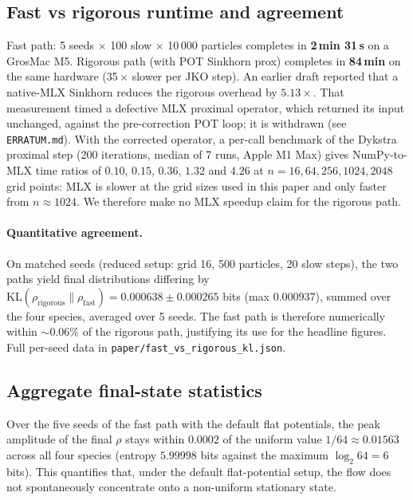 \documentclass[11pt]{article}
\begin{document}
\subsection{Fast vs rigorous runtime and agreement}
Fast path: 5 seeds $\times$ 100 slow $\times$ 10\,000 particles completes
in \textbf{2\,min 31\,s} on a GrosMac M5. Rigorous path (with POT Sinkhorn
prox) completes in \textbf{84\,min} on the same hardware
(35\,$\times$ slower per JKO step).
An earlier draft reported that a native-MLX Sinkhorn reduces the
rigorous overhead by $5.13\times$. That measurement timed a defective
MLX proximal operator, which returned its input unchanged, against the
pre-correction POT loop; it is withdrawn (see \texttt{ERRATUM.md}).
With the corrected operator, a per-call benchmark of the Dykstra
proximal step (200 iterations, median of 7 runs, Apple M1 Max) gives
NumPy-to-MLX time ratios of $0.10$, $0.15$, $0.36$, $1.32$ and $4.26$
at $n = 16, 64, 256, 1024, 2048$ grid points: MLX is slower at the
grid sizes used in this paper and only faster from $n \approx 1024$.
We therefore make no MLX speedup claim for the rigorous path.

\paragraph{Quantitative agreement.} On matched seeds
(reduced setup: grid 16, 500 particles, 20 slow steps), the two paths
yield final distributions differing by
$\mathrm{KL}(\rho_{\text{rigorous}} \| \rho_{\text{fast}}) =
0.000638 \pm 0.000265$ bits (max $0.000937$), summed over the four
species, averaged over 5 seeds. The fast path is therefore
numerically within $\sim\!0.06\%$ of the rigorous path, justifying
its use for the headline figures. Full per-seed data in
\texttt{paper/fast\_vs\_rigorous\_kl.json}.

\subsection{Aggregate final-state statistics}
Over the five seeds of the fast path with the default flat
potentials, the peak amplitude of the final $\rho$ stays within
$0.0002$ of the uniform value $1/64 \approx 0.01563$ across all four
species (entropy $5.99998$ bits against the maximum $\log_2 64 = 6$
bits). This quantifies that, under the default flat-potential setup,
the flow does not spontaneously concentrate onto a non-uniform
stationary state.
\end{document}

